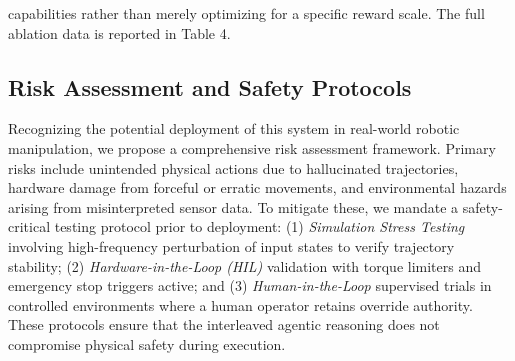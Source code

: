 capabilities rather than merely optimizing for a specific reward scale. The full ablation data is reported in Table 4.

\subsection*{Risk Assessment and Safety Protocols}
Recognizing the potential deployment of this system in real-world robotic manipulation, we propose a comprehensive risk assessment framework. Primary risks include unintended physical actions due to hallucinated trajectories, hardware damage from forceful or erratic movements, and environmental hazards arising from misinterpreted sensor data. To mitigate these, we mandate a safety-critical testing protocol prior to deployment: (1) \textit{Simulation Stress Testing} involving high-frequency perturbation of input states to verify trajectory stability; (2) \textit{Hardware-in-the-Loop (HIL)} validation with torque limiters and emergency stop triggers active; and (3) \textit{Human-in-the-Loop} supervised trials in controlled environments where a human operator retains override authority. These protocols ensure that the interleaved agentic reasoning does not compromise physical safety during execution.

